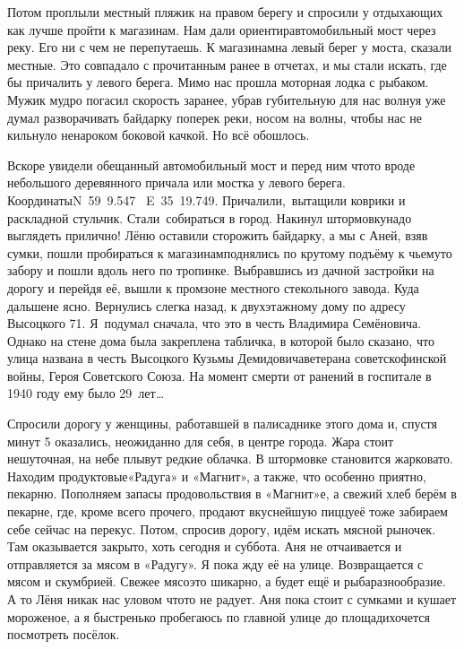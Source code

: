 Потом проплыли местный пляжик на правом берегу и спросили у отдыхающих как лучше пройти к магазинам. Нам дали ориентир\mdash автомобильный мост через реку. Его ни с чем не перепутаешь. К магазинам\mdash на левый берег у моста, сказали местные. Это совпадало с прочитанным ранее в отчетах, и мы стали искать, где бы причалить у левого берега. Мимо нас прошла моторная лодка с рыбаком. Мужик мудро погасил скорость заранее, убрав губительную для нас волну\mdash я уже думал разворачивать байдарку поперек реки, носом на волны, чтобы нас не кильнуло ненароком боковой качкой. Но всё обошлось. 

Вскоре увидели обещанный автомобильный мост и перед ним что\sdash то вроде небольшого деревянного причала или мостка у левого берега. Координаты\mdash N~59\degree~9.547\textprime~ E~35\degree~19.749\textprime. Причалили,~вытащили коврики и раскладной стульчик. Стали~собираться в город. Накинул штормовку\mdash надо выглядеть прилично! Лёню оставили сторожить байдарку, а мы с Аней, взяв сумки, пошли пробираться к магазинам\mdash поднялись по крутому подъёму к чьему\sdash то забору и пошли вдоль него по тропинке. Выбравшись из дачной застройки на дорогу и перейдя её, вышли к промзоне местного стекольного завода. Куда дальше\mdash не ясно. Вернулись слегка назад, к двухэтажному дому по адресу Высоцкого 71. Я~подумал сначала, что это в честь Владимира Семёновича. Однако на стене дома была закреплена табличка, в которой было сказано, что улица названа в честь Высоцкого Кузьмы Демидовича\mdash ветерана советско\sdash финской войны, Героя Советского Союза. На момент смерти от ранений в госпитале в 1940 году ему было 29~лет\ldots 

Спросили дорогу у женщины, работавшей в палисаднике этого дома и, спустя минут 5 оказались, неожиданно для себя, в центре города. Жара стоит нешуточная, на небе плывут редкие облачка. В штормовке становится жарковато. Находим продуктовые\mdash «Радуга» и «Магнит», а также, что особенно приятно, пекарню. Пополняем запасы продовольствия в «Магнит»\sdash е, а свежий хлеб берём в пекарне, где, кроме всего прочего, продают вкуснейшую пиццу\mdash её тоже забираем себе сейчас на перекус. Потом, спросив дорогу, идём искать мясной рыночек. Там оказывается закрыто, хоть сегодня и суббота. Аня не отчаивается и отправляется за мясом в «Радугу». Я пока жду её на улице. Возвращается с мясом и скумбрией. Свежее мясо\mdash это шикарно, а будет ещё и рыба\mdash разнообразие. А то Лёня никак нас уловом что\sdash то не радует. Аня пока стоит с сумками и кушает мороженое, а я быстренько пробегаюсь по главной улице до площади\mdash хочется посмотреть посёлок.

